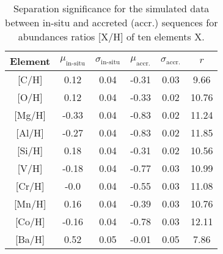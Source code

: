 \begin{table}
    \centering
    \caption{Separation significance for the simulated data between in-situ and accreted (accr.) sequences for abundances ratios [X/H] of ten elements X.}
    \begin{tabular}{cccccc}
    \hline
    Element & $\mu_\text{in-situ}$ & $\sigma_\text{in-situ}$ & $\mu_\text{accr.}$ & $\sigma_\text{accr.}$ & $r$\\
    \hline \hline
    {[C/H]}  & 0.12 & 0.04 & -0.31 & 0.03 & 9.66 \\
    {[O/H]}  & 0.12 & 0.04 & -0.33 & 0.02 & 10.76 \\
    {[Mg/H]}  & -0.33 & 0.04 & -0.83 & 0.02 & 11.24 \\
    {[Al/H]}  & -0.27 & 0.04 & -0.83 & 0.02 & 11.85 \\
    {[Si/H]}  & 0.18 & 0.04 & -0.31 & 0.02 & 10.56 \\
    {[V/H]}  & -0.18 & 0.04 & -0.77 & 0.03 & 10.99 \\
    {[Cr/H]}  & -0.0 & 0.04 & -0.55 & 0.03 & 11.08 \\
    {[Mn/H]}  & 0.16 & 0.04 & -0.39 & 0.03 & 10.76 \\
    {[Co/H]}  & -0.16 & 0.04 & -0.78 & 0.03 & 12.11 \\
    {[Ba/H]}  & 0.52 & 0.05 & -0.01 & 0.05 & 7.86 \\
    \hline
    \end{tabular}
    \label{tab:separation_significance_two_sequences}
\end{table}
